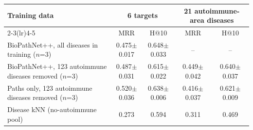 \begin{tabular}{lcccc}
\toprule
Training data & \multicolumn{2}{c}{6 targets} & \multicolumn{2}{c}{21 autoimmune-area diseases}\\
\cmidrule(lr){2-3}\cmidrule(lr){4-5}
 & MRR & H@10 & MRR & H@10\\
\midrule
BioPathNet++, all diseases in training ($n$=3) & 0.475$\pm$0.017 & 0.648$\pm$0.033 & -- & --\\
BioPathNet++, 123 autoimmune diseases removed ($n$=3) & 0.487$\pm$0.031 & 0.615$\pm$0.022 & 0.449$\pm$0.042 & 0.640$\pm$0.037\\
Paths only, 123 autoimmune diseases removed ($n$=3) & 0.520$\pm$0.036 & 0.638$\pm$0.006 & 0.416$\pm$0.037 & 0.621$\pm$0.009\\
Disease kNN (no-autoimmune pool) & 0.273 & 0.594 & 0.311 & 0.469\\
\bottomrule
\end{tabular}